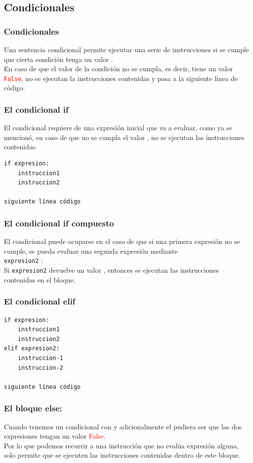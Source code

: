 \subsection{Condicionales}
\begin{frame}
\frametitle{Condicionales}
Una sentencia condicional permite ejecutar una serie de instrucciones si se cumple que cierta condición tenga un valor .
\\
\bigskip
En caso de que el valor de la condición no se cumpla, es decir, tiene un valor \textcolor{red}{\texttt{False}}, no se ejecutan la instrucciones contenidas y pasa a la siguiente línea de código.
\end{frame}
\begin{frame}[fragile]
\frametitle{El condicional if}
El condicional  requiere de una expresión inicial que va a evaluar, como ya se mencionó, en caso de que no se cumpla el valor , no se ejecutan las instrucciones contenidas.
\begin{verbatim}
if expresion:
    instruccion1
    instruccion2

siguiente línea código
\end{verbatim}
\end{frame}
\begin{frame}
\frametitle{El condicional if compuesto}
El condicional  puede ocuparse en el caso de que si una primera expresión no se cumple, se pueda evaluar una segunda expresión mediante
\\
\bigskip
{} \texttt{expresion2} :
\\
\bigskip
Si \texttt{expresion2} devuelve un valor , entonces se ejecutan las instrucciones contenidas en el bloque.
\end{frame}
\begin{frame}[fragile]
\frametitle{El condicional elif}

\begin{verbatim}
if expresion:
    instruccion1
    instruccion2
elif expresion2:
    instruccion-1
    instruccion-2

siguiente línea código
\end{verbatim}
\end{frame}
\begin{frame}
\frametitle{El bloque else:}
Cuando tenemos un condicional con  y adicionalmente el  pudiera ser que las dos expresiones tengan un valor \textcolor{red}{False}.
\\
\bigskip
Por lo que podemos recurrir a una instrucción  que no evalúa expresión alguna, solo permite que se ejecuten las instrucciones contenidas dentro de este bloque.
\end{frame}
